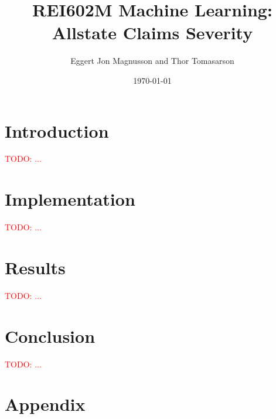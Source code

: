\documentclass[a4paper]{article}
\title{REI602M Machine Learning: Allstate Claims Severity}
\author{Eggert Jon Magnusson and Thor Tomasarson}
\date{\today}
\newcommand\todo[1]{\textcolor{red}{TODO: #1}}
\begin{document}
\maketitle

\section{Introduction}
\todo{...}


\section{Implementation}
\todo{...}

%

\section{Results}
\todo{...}




\section{Conclusion}
\todo{...}


\newpage
\appendix
\section{Appendix}
\end{document}
